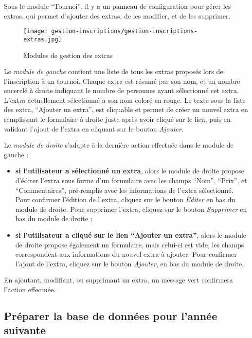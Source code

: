 Sous le module \enquote{Tournoi}, il y a un panneau de configuration pour gérer les extras, qui permet d'ajouter des extras, de les modifier, et de les supprimer.

\begin{figure}[H]
\centering
\texttt{[image: gestion-inscriptions/gestion-inscriptions-extras.jpg]}
\caption{Modules de gestion des extras}
\end{figure}

Le \textit{module de gauche} contient une liste de tous les extras proposés lors de l'inscription à un tournoi. Chaque extra est résumé par son nom, et un nombre encerclé à droite indiquant le nombre de personnes ayant sélectionné cet extra. L'extra actuellement sélectionné a son nom coloré en rouge. Le texte sous la liste des extra, \enquote{Ajouter un extra}, est cliquable et permet de créer un nouvel extra en remplissant le formulaire à droite juste après avoir cliqué sur le lien, puis en validant l'ajout de l'extra en cliquant sur le bouton \textit{Ajouter}.\newline

Le \textit{module de droite} s'adapte à la dernière action effectuée dans le module de gauche :

\begin{itemize}
\item \textbf{si l'utilisateur a sélectionné un extra}, alors le module de droite propose d'éditer l'extra sous forme d'un formulaire avec les champs \enquote{Nom}, \enquote{Prix}, et \enquote{Commentaires}, pré-remplis avec les informations de l'extra sélectionné. Pour confirmer l'édition de l'extra, cliquez sur le bouton \textit{Editer} en bas du module de droite. Pour supprimer l'extra, cliquez sur le bouton \textit{Supprimer} en bas du module de droite ;
\item \textbf{si l'utilisateur a cliqué sur le lien \enquote{Ajouter un extra}}, alors le module de droite propose également un formulaire, mais celui-ci est vide, les champs correspondent aux informations du nouvel extra à ajouter. Pour confirmer l'ajout de l'extra, cliquez sur le bouton \textit{Ajouter}, en bas du module de droite.
\end{itemize}
\bigskip

En ajoutant, modifiant, ou supprimant un extra, un message vert confirmera l'action effectuée.

\subsection{Préparer la base de données pour l'année suivante}

